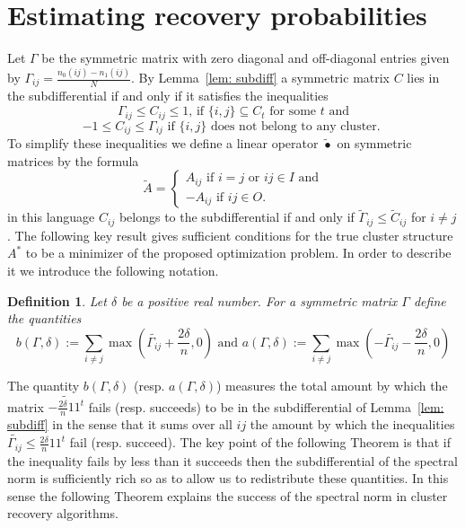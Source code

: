 \documentclass[12pt]{amsart}
\newtheorem{definition}[lemma]{Definition}
\theoremstyle{remark}
\begin{document}
\section{Estimating recovery probabilities}

Let $\Gamma$ be the symmetric matrix with zero diagonal and off-diagonal entries given by
$\Gamma_{ij}=\frac{n_0(ij)-n_1(ij)}{N}$. By Lemma~\ref{lem: subdiff} a symmetric matrix $C$ lies in the subdifferential if and only if it satisfies the inequalities
\[ \Gamma_{ij}\leq C_{ij}\leq 1 \text{, if $\{i,j\}\subseteq C_t$ for some $t$ and}\]
\[-1\leq C_{ij} \leq \Gamma_{ij} \text{ if $\{i,j\}$ does not belong to any cluster. } \]
To simplify these inequalities we define a linear operator $\widetilde{\bullet}$ on symmetric matrices by the formula
\[ \widetilde{A} = 
\begin{cases}
A_{ij}\text{ if $i=j$ or $ij\in I$ and}\\
-A_{ij}\text{ if $ij\in O$.}
\end{cases}
\]
in this language $C_{ij}$ belongs to the subdifferential if and only if $\widetilde{\Gamma}_{ij}\leq \widetilde{C}_{ij}$ for $i\neq j$.
The following key result gives sufficient conditions for the true cluster structure $A^*$ to be a minimizer of the proposed optimization problem. In order to describe it we introduce the following notation. 

\begin{definition} Let $\delta$ be a positive real number. For a symmetric matrix $\Gamma$ define the quantities
\[b(\Gamma,\delta):=\sum_{i\neq j} \max\left(\widetilde{\Gamma_{ij}}+\frac{2\delta}{n},0\right)
\text{ and } a(\Gamma,\delta):=\sum_{i\neq j} \max\left(-\widetilde{\Gamma_{ij}}-\frac{2\delta}{n},0\right)
\]\end{definition}
The quantity $b(\Gamma,\delta)$ (resp. $a(\Gamma,\delta)$) measures the total amount by which the matrix $\widetilde{-\frac{2\delta}{n}11^t}$ fails (resp. succeeds) to be in the subdifferential of Lemma~\ref{lem: subdiff} in the sense that it sums over all $ij$ the amount by which the inequalities $\widetilde{\Gamma_{ij}}\leq \frac{2\delta}{n} 11^t$ fail (resp. succeed). The key point of the following Theorem is that if the inequality fails by less than it succeeds then the subdifferential of the spectral norm is sufficiently rich so as to allow us to redistribute these quantities. In this sense the following Theorem explains the success of the spectral norm in cluster recovery algorithms. 
\end{document}
